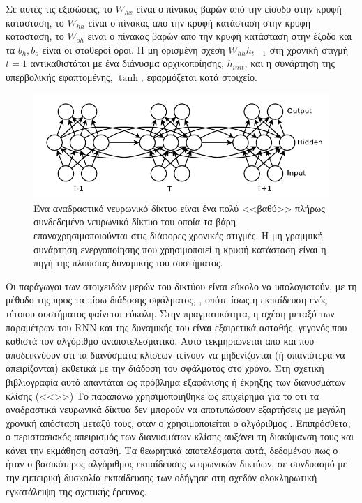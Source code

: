 Σε αυτές τις εξισώσεις, το $W_{hx}$ είναι ο πίνακας βαρών από την είσοδο στην κρυφή κατάσταση, το $W_{hh}$ είναι ο πίνακας απο την κρυφή κατάσταση στην κρυφή κατάσταση, το $W_{oh}$ είναι ο πίνακας βαρών απο την κρυφή κατάσταση στην έξοδο και τα $b_h, b_o$ είναι οι σταθεροί όροι.
Η μη ορισμένη σχέση $W_{hh}h_{t-1}$ στη χρονική στιγμή $t = 1$ αντικαθιστάται με ένα διάνυσμα αρχικοποίησης, $h_{init}$, και η συνάρτηση της υπερβολικής εφαπτομένης, $\tanh$, εφαρμόζεται κατά στοιχείο.

\begin{figure}[tph]
	\includegraphics[width=\textwidth, keepaspectratio]{images/rnn.png}
	\centering 
	\caption{Ένα αναδραστικό νευρωνικό δίκτυο είναι ένα πολύ <<βαθύ>> πλήρως συνδεδεμένο νευρωνικό 			δίκτυο του οποία τα βάρη επαναχρησιμοποιούνται στις διάφορες χρονικές στιγμές. Η μη 					γραμμική συνάρτηση ενεργοποίησης που χρησιμοποιεί η κρυφή κατάσταση είναι η πηγή της 					πλούσιας δυναμικής του συστήματος.}
	\label{fig:rnn}
\end{figure}

Οι παράγωγοι των στοιχειδών μερών του δικτύου είναι εύκολο να υπολογιστούν, με τη μέθοδο της προς τα πίσω διάδοσης σφάλματος, \cite{Graves2013}, \cite{Rieman2014} οπότε ίσως η εκπαίδευση ενός τέτοιου συστήματος φαίνεται εύκολη.
Στην πραγματικότητα, η σχέση μεταξύ των παραμέτρων του RNN και της δυναμικής του είναι εξαιρετικά ασταθής, γεγονός που καθιστά τον αλγόριθμο  αναποτελεσματικό.
Αυτό τεκμηριώνεται απο \cite{tofill} και \cite{tofill} που αποδεικνύουν οτι τα διανύσματα κλίσεων τείνουν να μηδενίζονται (ή σπανιότερα να απειρίζονται) εκθετικά με την διάδοση του σφάλματος στο χρόνο.
Στη σχετική βιβλιογραφία αυτό απαντάται ως πρόβλημα εξαφάνισης ή έκρηξης των διανυσμάτων κλίσης (<<>>)
Το παραπάνω χρησιμοποιήθηκε ως επιχείρημα για το οτι τα αναδραστικά νευρωνικά δίκτυα δεν μπορούν να αποτυπώσουν εξαρτήσεις με μεγάλη χρονική απόσταση μεταξύ τους, οταν ο χρησιμοποιείται ο αλγόριθμος .
Επιπρόσθετα, ο περιστασιακός απειρισμός των διανυσμάτων κλίσης αυξάνει τη διακύμανση τους και κάνει την εκμάθηση ασταθή.
Τα θεωρητικά αποτελέσματα αυτά, δεδομένου πως ο  ήταν ο βασικότερος αλγόριθμος εκπαίδευσης νευρωνικών δικτύων, σε συνδυασμό με την εμπειρική δυσκολία εκπαίδευσης των  οδήγησε στη σχεδόν ολοκληρωτική εγκατάλειψη της σχετικής έρευνας.

